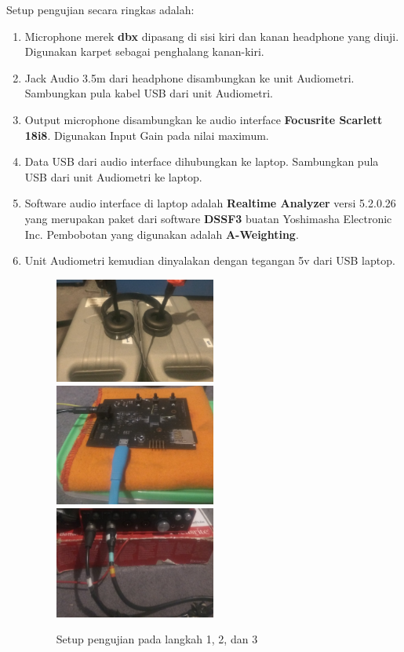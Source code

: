 \documentclass[12pt,]{article}
\begin{document}
	Setup pengujian secara ringkas adalah:
	\begin{enumerate}
		\item Microphone merek \textbf{dbx} dipasang di sisi kiri dan kanan headphone yang diuji.
		Digunakan karpet sebagai penghalang kanan-kiri.
		
		\item Jack Audio 3.5m dari headphone disambungkan ke unit Audiometri.
		Sambungkan pula kabel USB dari unit Audiometri.
		
		\item Output microphone disambungkan ke audio interface \textbf{Focusrite Scarlett 18i8}.
		Digunakan Input Gain pada nilai maximum.
		
		\item Data USB dari audio interface dihubungkan ke laptop.
		Sambungkan pula USB dari unit Audiometri ke laptop.
		
		\item Software audio interface di laptop adalah \textbf{Realtime Analyzer} versi 5.2.0.26 yang
		merupakan paket dari software \textbf{DSSF3} buatan Yoshimasha Electronic Inc.
		Pembobotan yang digunakan adalah \textbf{A-Weighting}.
		
		\item Unit Audiometri kemudian dinyalakan dengan tegangan 5v dari USB laptop.
		
		\begin{figure}[!ht]
			\centering
			\includegraphics[width=150pt]{images/setup0}
			\includegraphics[width=150pt]{images/setup1}
			\includegraphics[width=150pt]{images/setup2}
			\caption{Setup pengujian pada langkah 1, 2, dan 3}
		\end{figure}
		

\end{enumerate}
\end{document}
